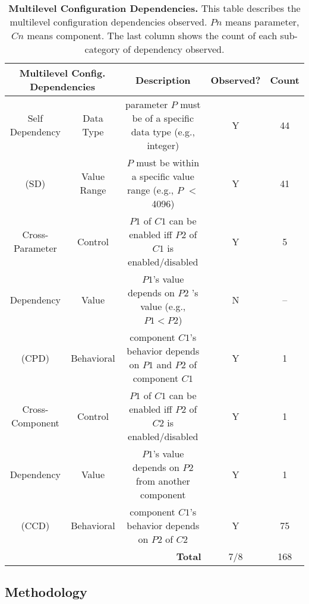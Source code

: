 \begin{table*}[t]
	\small
	\begin{center}
		\begin{tabular}{ c | c | c | c | c  }
		\multicolumn{2}{c|}{	\textbf{Multilevel Config. Dependencies}} & \textbf{Description} & \textbf{Observed?}  &  \textbf{Count}  \\
          \hline
Self Dependency	  &  Data Type  & parameter $P$ must be of a specific data type (e.g., integer)   &   Y  &  44\\
					\cline{2-5}
   (SD)        & Value Range & $P$  must be within a specific  {value range} (e.g., $P$  $<$ 4096)  & Y & 41\\
			\hline
Cross-Parameter      & Control  &  $P1$  of $C1$ can   be enabled iff   $P2$  of $C1$  is enabled/disabled & Y & 5 \\
					\cline{2-5}
  Dependency      &  Value    &  $P1$'s  value depends on   $P2$ 's value (e.g., $P1 < P2$)   &  N & -- \\
             \cline{2-5}
     (CPD) &    Behavioral &     component $C1$'s behavior depends on $P1$ and $P2$ of component $C1$ & Y & 1 \\ 

			\hline
Cross-Component      & Control    & $P1$  of $C1$ can   be enabled iff   $P2$  of $C2$  is enabled/disabled &  Y&  1 \\
					\cline{2-5}
 Dependency    & Value   &$P1$'s  value depends on  $P2$ from another component   &  Y & 1\\
 \cline{2-5}
 (CCD)  & Behavioral   &  component $C1$'s behavior  depends on  $P2$ of  $C2$ &  Y&  75\\
 \hline
 \multicolumn{3}{r|}{\textbf{Total}} & 7/8  & 168  \\

\hline
		\end{tabular}
	\end{center}
	\caption{ {\bf Multilevel Configuration Dependencies.} This table describes the multilevel configuration dependencies observed. $Pn$ means parameter, $Cn$ means component. The last column shows the count of each sub-category of dependency observed. 
}
	\label{tab:dependencies}
\end{table*}

\subsection{Methodology}
\label{sec:methodology}

